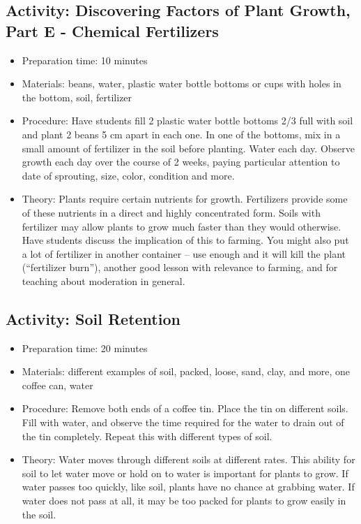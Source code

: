 \subsection{Activity: Discovering Factors of Plant Growth, Part E - Chemical Fertilizers}
\begin{itemize}
\item{Preparation time: 10 minutes}
\item{Materials: beans, water, plastic water bottle bottoms or cups with holes in the bottom, soil, fertilizer}
\item{Procedure: Have students fill 2 plastic water bottle bottoms 2/3 full with soil and plant 2 beans 5 cm apart in each one. In one of the bottoms, mix in a small amount of fertilizer in the soil before planting. Water each day. Observe growth each day over the course of 2 weeks, paying particular attention to date of sprouting, size, color, condition and more.}
\item{Theory: Plants require certain nutrients for growth. Fertilizers provide some of these nutrients in a direct and highly concentrated form. Soils with fertilizer may allow plants to grow much faster than they would otherwise. Have students discuss the implication of this to farming. You might also put a lot of fertilizer in another container – use enough and it will kill the plant (“fertilizer burn”), another good lesson with relevance to farming, and for teaching about moderation in general.}
\end{itemize}

\subsection{Activity: Soil Retention}
\begin{itemize}
\item{Preparation time: 20 minutes}
\item{Materials: different examples of soil, packed, loose, sand, clay, and more, one coffee can, water}
\item{Procedure: Remove both ends of a coffee tin. Place the tin on different soils. Fill with water, and observe the time required for the water to drain out of the tin completely. Repeat this with different types of soil.}
\item{Theory: Water moves through different soils at different rates. This ability for soil to let water move or hold on to water is important for plants to grow. If water passes too quickly, like soil, plants have no chance at grabbing water. If water does not pass at all, it may be too packed for plants to grow easily in the soil.}
\end{itemize}

